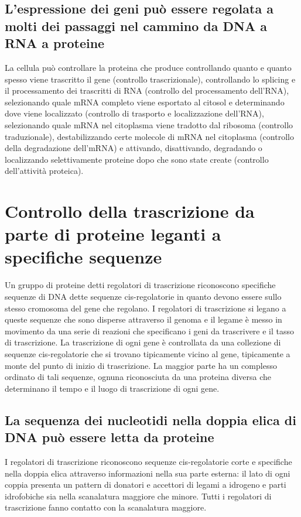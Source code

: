 \subsection{L'espressione dei geni pu\`o essere regolata a molti dei passaggi nel cammino da DNA a RNA a proteine}
La cellula pu\`o controllare la proteina che produce controllando quanto e quanto spesso viene trascritto il gene (controllo trascrizionale), controllando lo splicing e il processamento
dei trascritti di RNA (controllo del processamento dell'RNA), selezionando quale mRNA completo viene esportato al citosol e determinando dove viene localizzato (controllo di trasporto e 
localizzazione dell'RNA), selezionando quale mRNA nel citoplasma viene tradotto dal ribosoma (controllo traduzionale), destabilizzando certe molecole di mRNA nel citoplasma (controllo 
della degradazione dell'mRNA) e attivando, disattivando, degradando o localizzando selettivamente proteine dopo che sono state create (controllo dell'attivit\`a proteica).
\section{Controllo della trascrizione da parte di proteine leganti a specifiche sequenze}
Un gruppo di proteine detti regolatori di trascrizione riconoscono specifiche sequenze di DNA dette sequenze cis-regolatorie in quanto devono essere sullo stesso cromosoma del gene che
regolano. I regolatori di trascrizione si legano a queste sequenze che sono disperse attraverso il genoma e il legame \`e messo in movimento da una serie di reazioni che specificano 
i geni da trascrivere e il tasso di trascrizione. La trascrizione di ogni gene \`e controllata da una collezione di sequenze cis-regolatorie che si trovano tipicamente vicino al gene, 
tipicamente a monte del punto di inizio di trascrizione. La maggior parte ha un complesso ordinato di tali sequenze, ognuna riconosciuta da una proteina diversa che determinano il 
tempo e il luogo di trascrizione di ogni gene. 
\subsection{La sequenza dei nucleotidi nella doppia elica di DNA pu\`o essere letta da proteine}
I regolatori di trascrizione riconoscono sequenze cis-regolatorie corte e specifiche nella doppia elica attraverso informazioni nella sua parte esterna: il lato di ogni coppia presenta
un pattern di donatori e accettori di legami a idrogeno e parti idrofobiche sia nella scanalatura maggiore che minore. Tutti i regolatori di trascrizione fanno contatto con la 
scanalatura maggiore.
